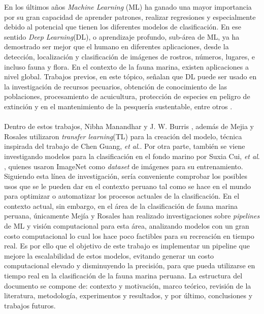 
En los últimos años \textit{Machine Learning} (ML) ha ganado una mayor importancia por su gran capacidad de aprender patrones, realizar regresiones y especialmente debido al potencial que tienen los diferentes modelos de clasificación. En ese sentido \textit{Deep Learning}(DL), o aprendizaje profundo, sub-área de ML, ya ha demostrado ser mejor que el humano en diferentes aplicaciones, desde la detección, localización y clasificación de imágenes de rostros, números, lugares, e incluso fauna y flora. 
\newline
\newline
En el contexto de la fauna marina, existen aplicaciones a nivel global. Trabajos previos,  en este tópico, señalan que DL puede ser usado en la investigación de recursos pecuarios, obtención de conocimiento de las poblaciones, procesamiento de acuicultura, protección de especies en peligro de extinción y en el mantenimiento de la pesquería sustentable, entre otros \cite{10.1145/3419635.3419643, 10.1145/3325917.3325934,20.500.12724/11174,8371919}. \\\\
Dentro de estos trabajos, Nibha Manandhar y J. W. Burris \cite{10.1145/3325917.3325934}, además de Mejia y Rosales \cite{20.500.12724/11174} utilizaron \textit{transfer learning}(TL) para la creación del modelo, técnica inspirada del trabajo de Chen Guang, \textit{et al}.\cite{8371919}.
Por otra parte, también se viene investigando modelos para la clasificación en el fondo marino por Suxia Cui, \textit{et al}. \cite{Cui2020}, quienes usaron ImageNet\cite{ImageNet} como \textit{dataset} de imágenes para su entrenamiento. 
\newline
\newline
Siguiendo esta línea de investigación, sería conveniente comprobar los posibles usos que se le pueden dar en el contexto peruano tal como se hace en el mundo para optimizar o automatizar los procesos actuales de la clasificación. En el contexto actual, sin embargo, en el área de la clasificación de fauna marina peruana, únicamente Mejía y Rosales \cite{20.500.12724/11174} han realizado investigaciones sobre \textit{pipelines} de ML y visión computacional para esta área, analizando modelos con un gran costo computacional lo cual los hace poco factibles para su recreación en tiempo real.
\newline
\newline
Es por ello que el objetivo de este trabajo es implementar un pipeline que mejore la escalabilidad de estos modelos, evitando generar un costo computacional elevado y disminuyendo la precisión, para que pueda utilizarse en tiempo real en la clasificación de la fauna marina peruana. La estructura del documento se compone de: contexto y motivación, marco teórico, revisión de la literatura, metodología, experimentos y resultados, y por último, conclusiones y trabajos futuros.